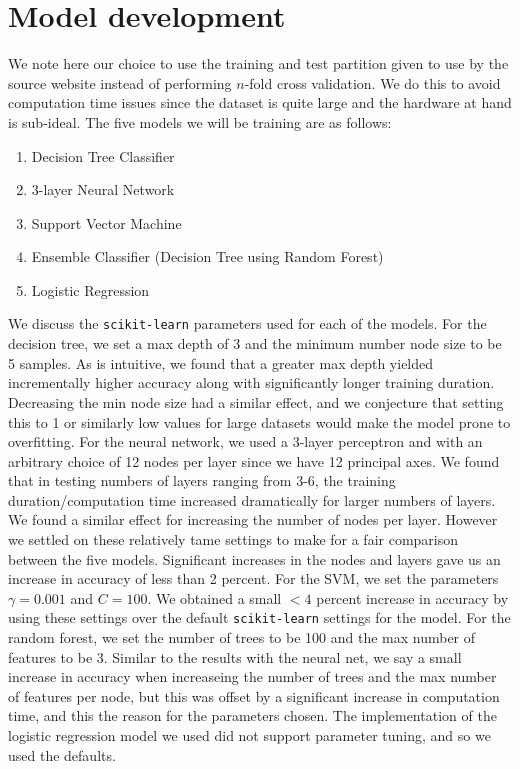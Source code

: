\documentclass[11pt,oneside,reqno]{amsart}
\theoremstyle{plain}
\theoremstyle{definition}
\theoremstyle{remark}
\newcommand{\inlinecode}{\texttt}
\begin{document}
\section{Model development}

We note here our choice to use the training and test partition given to use by the source website instead of performing $n$-fold cross validation. We do this to avoid computation time issues since the dataset is quite large and the hardware at hand is sub-ideal. The five models we will be training are as follows:

\begin{enumerate}
\item Decision Tree Classifier
\item 3-layer Neural Network
\item Support Vector Machine
\item Ensemble Classifier (Decision Tree using Random Forest)
\item Logistic Regression
\end{enumerate}

We discuss the \inlinecode{scikit-learn} parameters used for each of the models. For the decision tree, we set a max depth of 3 and the minimum number node size to be 5 samples. As is intuitive, we found that a greater max depth yielded incrementally higher accuracy along with significantly longer training duration. Decreasing the min node size had a similar effect, and we conjecture that setting this to 1 or similarly low values for large datasets would make the model prone to overfitting. For the neural network, we used a 3-layer perceptron and with an arbitrary choice of 12 nodes per layer since we have 12 principal axes. We found that in testing numbers of layers ranging from 3-6, the training duration/computation time increased dramatically for larger numbers of layers. We found a similar effect for increasing the number of nodes per layer. However we settled on these relatively tame settings to make for a fair comparison between the five models. Significant increases in the nodes and layers gave us an increase in accuracy of less than 2 percent. For the SVM, we set the parameters $\gamma = 0.001$ and $C  = 100$. We obtained a small $<4$ percent increase in accuracy by using these settings over the default \inlinecode{scikit-learn} settings for the model. For the random forest, we set the number of trees to be 100 and the max number of features to be 3. Similar to the results with the neural net, we say a small increase in accuracy when increaseing the number of trees and the max number of features per node, but this was offset by a significant increase in computation time, and this the reason for the parameters chosen. The implementation of the logistic regression model we used did not support parameter tuning, and so we used the defaults. 
\end{document}
